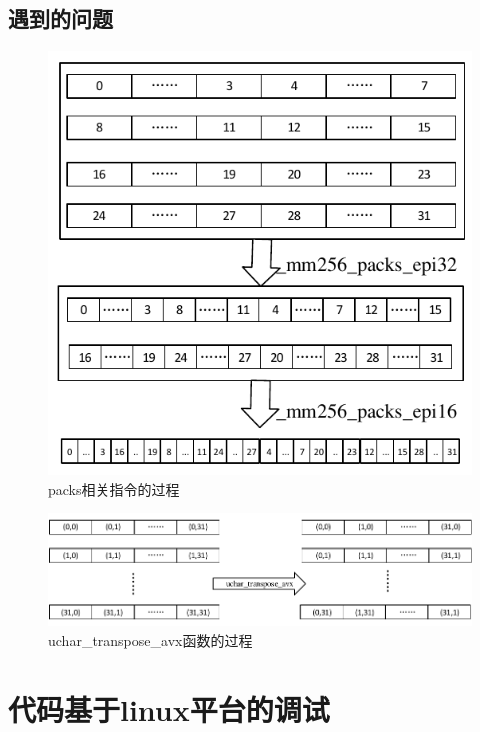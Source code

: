 \documentclass{article}
\begin{document}
\subsection{遇到的问题}
\begin{figure}[H]
	\centering
	\includegraphics[width = .7\textwidth]{packs.pdf}
	\caption{packs相关指令的过程}
\end{figure}
\begin{figure}[H]
	\centering
	\includegraphics[width = \textwidth]{unpack.pdf}
	\caption{uchar\_transpose\_avx函数的过程}
\end{figure}

\section{代码基于linux平台的调试}
\end{document}
